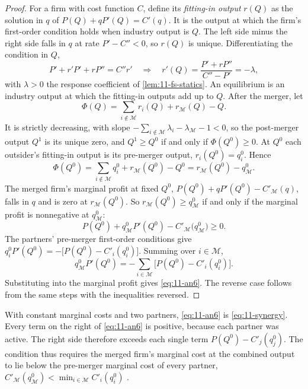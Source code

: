 \begin{proof}
For a firm with cost function $C$, define its \emph{fitting-in output} $r(Q)$ as the solution in $q$ of $P(Q) +
qP'(Q) = C'(q)$. It is the output at which the firm's first-order condition holds when industry output is $Q$. The
left side minus the right side falls in $q$ at rate $P' - C'' < 0$, so $r(Q)$ is unique. Differentiating the
condition in $Q$,
\begin{equation*}
P' + r'P' + rP'' = C''r'
\quad\Longrightarrow\quad
r'(Q) = \frac{P' + rP''}{C'' - P'} = -\lambda ,
\end{equation*}
with $\lambda > 0$ the response coefficient of \cref{lem:11-fs-statics}. An equilibrium is an industry output at
which the fitting-in outputs add up to $Q$. After the merger, let
\begin{equation*}
\Phi(Q) = \sum_{i \notin \mathcal{M}} r_i(Q) + r_{\mathcal{M}}(Q) - Q .
\end{equation*}
It is strictly decreasing, with slope $-\sum_{i \notin \mathcal{M}}\lambda_i - \lambda_{\mathcal{M}} - 1 < 0$, so
the post-merger output $Q^1$ is its unique zero, and $Q^1 \ge Q^0$ if and only if $\Phi(Q^0) \ge 0$. At $Q^0$ each
outsider's fitting-in output is its pre-merger output, $r_i(Q^0) = q_i^0$. Hence
\begin{equation*}
\Phi(Q^0) = \sum_{i \notin \mathcal{M}} q_i^0 + r_{\mathcal{M}}(Q^0) - Q^0 = r_{\mathcal{M}}(Q^0) - q_{\mathcal{M}}^0 .
\end{equation*}
The merged firm's marginal profit at fixed $Q^0$, $P(Q^0) + qP'(Q^0) - C'_{\mathcal{M}}(q)$, falls in $q$ and is
zero at $r_{\mathcal{M}}(Q^0)$. So $r_{\mathcal{M}}(Q^0) \ge q_{\mathcal{M}}^0$ if and only if the marginal profit
is nonnegative at $q_{\mathcal{M}}^0$:
\begin{equation*}
P(Q^0) + q_{\mathcal{M}}^0P'(Q^0) - C'_{\mathcal{M}}\big(q_{\mathcal{M}}^0\big) \ge 0 .
\end{equation*}
The partners' pre-merger first-order conditions give $q_i^0P'(Q^0) = -\big[P(Q^0) - C'_i(q_i^0)\big]$. Summing over
$i \in \mathcal{M}$,
\begin{equation*}
q_{\mathcal{M}}^0P'(Q^0) = -\sum_{i \in \mathcal{M}}\big[P(Q^0) - C'_i(q_i^0)\big] .
\end{equation*}
Substituting into the marginal profit gives \eqref{eq:11-an6}. The reverse case follows from the same steps with
the inequalities reversed.
\end{proof}

With constant marginal costs and two partners, \eqref{eq:11-an6} is \eqref{eq:11-synergy}. Every term on the right of
\eqref{eq:11-an6} is positive, because each partner was active. The right side therefore exceeds each single term
$P(Q^0) - C'_j(q_j^0)$. The condition thus requires the merged firm's marginal cost at the combined output to lie
below the pre-merger marginal cost of every partner, $C'_{\mathcal{M}}(q_{\mathcal{M}}^0) < \min_{i \in
\mathcal{M}}C'_i(q_i^0)$ \citep[p.~229]{AskerNocke2021}.

